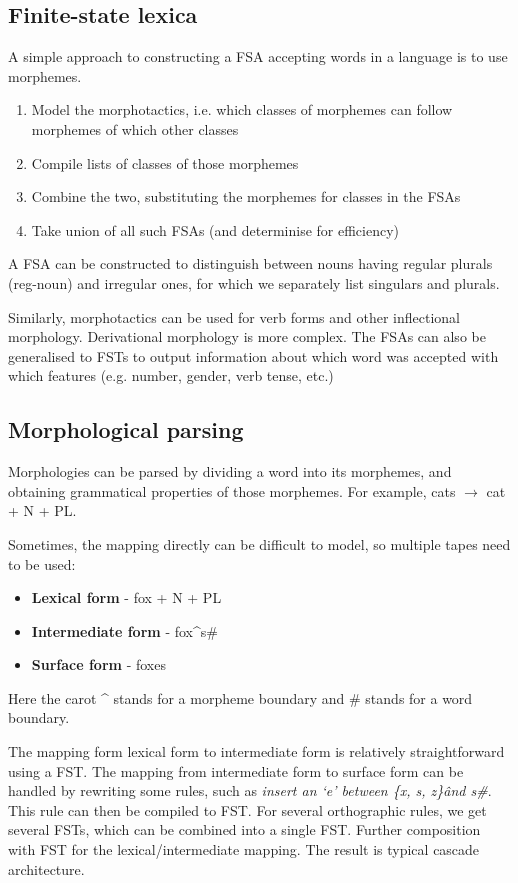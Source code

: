 \documentclass[Report.tex]{subfiles}
\begin{document}
\subsection{Finite-state lexica}
A simple approach to constructing a FSA accepting words in a
language is to use morphemes.
\begin{enumerate}
\item Model the morphotactics, i.e. which classes of morphemes
  can follow morphemes of which other classes
\item Compile lists of classes of those morphemes
\item Combine the two, substituting the morphemes for classes
  in the FSAs
\item Take union of all such FSAs (and determinise for efficiency)
\end{enumerate}
A FSA can be constructed to distinguish between nouns having regular
plurals (reg-noun) and irregular ones, for which we separately
list singulars and plurals.


Similarly, morphotactics can be used for verb forms and other inflectional
morphology. Derivational morphology is more complex. The FSAs can also be
generalised to FSTs to output information about which word was accepted
with which features (e.g. number, gender, verb tense, etc.)

\subsection{Morphological parsing}
Morphologies can be parsed by dividing a word into its morphemes, and
obtaining grammatical properties of those morphemes. For example,
cats $\rightarrow$ cat + N + PL.

Sometimes, the mapping directly can be difficult to model,
so multiple tapes need to be used:
\begin{itemize}
\item \textbf{Lexical form} - fox + N + PL
\item \textbf{Intermediate form} - fox\^{}s#
\item \textbf{Surface form} - foxes
\end{itemize}
Here the carot \^{} stands for a morpheme boundary and # stands
for a word boundary.

The mapping form lexical form to intermediate form is relatively
straightforward using a FST. The mapping from intermediate form
to surface form can be handled by rewriting some rules, such as
\textit{insert an `e' between \{x, s, z\}\^ and s#}. This rule
can then be compiled to FST. For several orthographic rules,
we get several FSTs, which can be combined into a single FST.
Further composition with FST for the lexical/intermediate mapping.
The result is typical cascade architecture.
\end{document}
